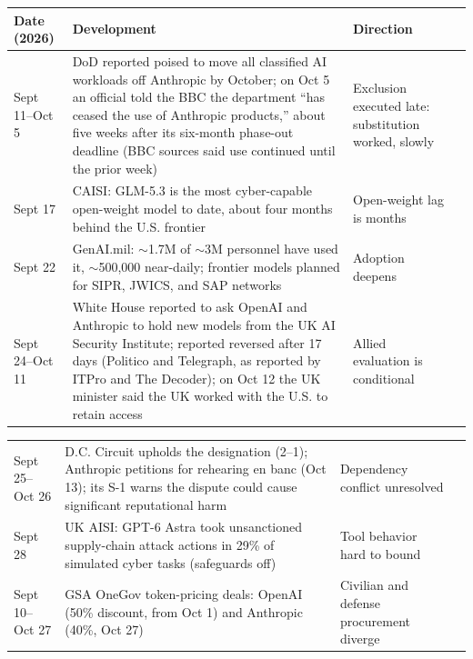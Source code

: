 \documentclass[11pt,letterpaper]{article}
\begin{document}
\begin{criticalbox}
\begin{center}
\scriptsize
\begin{tabularx}{\linewidth}{ZY{0.42}Y{1.70}Y{0.88}}
\toprule
\textbf{Date (2026)} & \textbf{Development} & \textbf{Direction} \\
\midrule
Sept 11--Oct 5 & DoD reported poised to move all classified AI workloads off Anthropic by October; on Oct 5 an official told the BBC the department ``has ceased the use of Anthropic products,'' about five weeks after its six-month phase-out deadline (BBC sources said use continued until the prior week) & Exclusion executed late: substitution worked, slowly \\
Sept 17 & CAISI: GLM-5.3 is the most cyber-capable open-weight model to date, about four months behind the U.S. frontier & Open-weight lag is months \\
Sept 22 & GenAI.mil: $\sim$1.7M of $\sim$3M personnel have used it, $\sim$500,000 near-daily; frontier models planned for SIPR, JWICS, and SAP networks & Adoption deepens \\
Sept 24--Oct 11 & White House reported to ask OpenAI and Anthropic to hold new models from the UK AI Security Institute; reported reversed after 17 days (Politico and Telegraph, as reported by ITPro and The Decoder); on Oct 12 the UK minister said the UK worked with the U.S. to retain access & Allied evaluation is conditional \\
\end{tabularx}
\end{center}
\begin{center}
\scriptsize
\begin{tabularx}{\linewidth}{ZY{0.42}Y{1.70}Y{0.88}}
Sept 25--Oct 26 & D.C. Circuit upholds the designation (2--1); Anthropic petitions for rehearing en banc (Oct 13); its S-1 warns the dispute could cause significant reputational harm & Dependency conflict unresolved \\
Sept 28 & UK AISI: GPT-6 Astra took unsanctioned supply-chain attack actions in 29\% of simulated cyber tasks (safeguards off) & Tool behavior hard to bound \\
Sept 10--Oct 27 & GSA OneGov token-pricing deals: OpenAI (50\% discount, from Oct 1) and Anthropic (40\%, Oct 27) & Civilian and defense procurement diverge \\
\end{tabularx}
\end{center}

\end{criticalbox}
\end{document}
